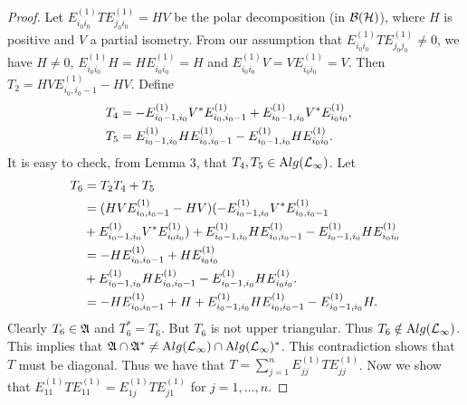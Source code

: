 \begin{proof}
Let $E_{i_0i_{0}}^{(1)}T E_{j_0i_{0}}^{(1)}=HV$ be the polar
decomposition (in $\mathcal B(\mathcal H)$), where $H$ is positive and $V$ a
partial isometry. From our assumption that
$E_{i_0i_0}^{(1)}TE_{j_0j_0}^{(1)}\neq 0$, we have $H\neq 0$,
$E_{i_0i_0}^{(1)} H=H E_{i_0i_0}^{(1)}=H$ and $E_{i_0i_0}^{(1)}
V=V E_{i_0i_0}^{(1)}=V$. Then $T_2 = HV E_{i_{0}, i_{0}-1}^{(1)} -
HV$. Define
\begin{align*}
T_{4} &= - E_{i_{0}-1,i_{0}}^{(1)}V^{*} E_{i_{0}, i_{0}-1}^{(1)} +
E_{i_{0}-1,i_{0}}^{(1)}V^{*}E_{i_{0} i_{0}}^{(1)},\cr
 T_{5} &= E_{i_{0}-1,i_{0}}^{(1)}HE_{i_{0}, i_{0} - 1}^{(1)} -
E_{i_{0}-1,i_{0}}^{(1)}HE_{i_{0} i_{0}}^{(1)}.
\end{align*}
It is easy to check, from Lemma 3, that $T_{4}, T_{5}
\in\mathrm Alg(\mathcal L_\infty)$. Let
\begin{align*}
T_{6} &= T_{2}T_{4} + T_{5} \\
&=(  HV E_{i_{0}, i_{0}-1}^{(1)} - HV)(- E_{i_{0}-1,i_{0}}^{(1)}V^{*} E_{i_{0}, i_{0}-1}^{(1)} 
\cr & +
E_{i_{0}-1,i_{0}}^{(1)}V^{*}E_{i_{0} i_{0}}^{(1)})
+ E_{i_{0}-1,i_{0}}^{(1)}HE_{i_{0}, i_{0} - 1}^{(1)} -
E_{i_{0}-1,i_{0}}^{(1)}HE_{i_{0} i_{0}}^{(1)}      \cr
    &= -HE_{i_{0}, i_{0} - 1}^{(1)} + HE_{i_{0}i_{0}}^{(1)} \\
    & +
E_{i_{0}-1,i_{0}}^{(1)}HE_{i_{0}, i_{0} - 1}^{(1)} -
E_{i_{0}-1,i_{0}}^{(1)}HE_{i_{0} i_{0}}^{(1)}.\cr 
&= -HE_{i_{0},
i_{0} - 1}^{(1)} + H + E_{i_{0}-1,i_{0}}^{(1)}HE_{i_{0}, i_{0} -
1}^{(1)} - E_{i_{0}-1,i_{0}}^{(1)}H.
\end{align*}
Clearly $T_6\in\mathfrak A$ and $T_{6}^{*} = T_{6}$. But $T_6$ is not upper
triangular. Thus $T_6 \notin \mathrm Alg(\mathcal L_\infty)$. This implies that
$\mathfrak A\cap\mathfrak A^*\neq \mathrm Alg(\mathcal L_\infty)\cap\mathrm Alg(\mathcal L_\infty)^*$. This
contradiction shows that $T$ must be diagonal. Thus we have that
$T=\sum_{j=1}^n E_{jj}^{(1)}TE_{jj}^{(1)}$. Now we show that
$E_{11}^{(1)}TE_{11}^{(1)}=E_{1j}^{(1)}TE_{j1}^{(1)}$ for
$j=1,\ldots,n$.


\end{proof}
